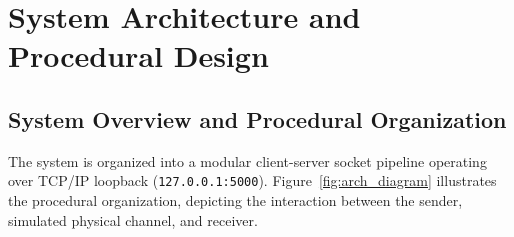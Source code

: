 \documentclass[11pt,a4paper]{article}
\begin{document}
\section{System Architecture and Procedural Design}

\subsection{System Overview and Procedural Organization}

The system is organized into a modular client-server socket pipeline operating over TCP/IP loopback (\texttt{127.0.0.1:5000}). Figure~\ref{fig:arch_diagram} illustrates the procedural organization, depicting the interaction between the sender, simulated physical channel, and receiver.
\end{document}
